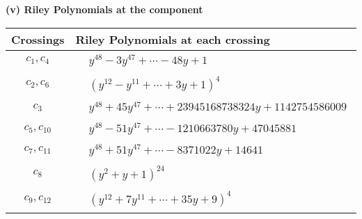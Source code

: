 \documentclass[1p]{elsarticle_modified}
\theoremstyle{definition}
\begin{document}
\flushleft \textbf{(v) Riley Polynomials at the component}\newline \\
\begin{tabular}{m{50pt}|m{274pt}}
Crossings & \hspace{64pt}Riley Polynomials at each crossing \\
\hline $$\begin{aligned}c_{1},c_{4}\end{aligned}$$&$\begin{aligned}
&y^{48}-3 y^{47}+\cdots-48 y+1
\end{aligned}$\\
\hline $$\begin{aligned}c_{2},c_{6}\end{aligned}$$&$\begin{aligned}
&(y^{12}- y^{11}+\cdots+3 y+1)^{4}
\end{aligned}$\\
\hline $$\begin{aligned}c_{3}\end{aligned}$$&$\begin{aligned}
&y^{48}+45 y^{47}+\cdots+23945168738324 y+1142754586009
\end{aligned}$\\
\hline $$\begin{aligned}c_{5},c_{10}\end{aligned}$$&$\begin{aligned}
&y^{48}-51 y^{47}+\cdots-1210663780 y+47045881
\end{aligned}$\\
\hline $$\begin{aligned}c_{7},c_{11}\end{aligned}$$&$\begin{aligned}
&y^{48}+51 y^{47}+\cdots-8371022 y+14641
\end{aligned}$\\
\hline $$\begin{aligned}c_{8}\end{aligned}$$&$\begin{aligned}
&(y^2+y+1)^{24}
\end{aligned}$\\
\hline $$\begin{aligned}c_{9},c_{12}\end{aligned}$$&$\begin{aligned}
&(y^{12}+7 y^{11}+\cdots+35 y+9)^{4}
\end{aligned}$\\
\hline
\end{tabular}\\~\\
\end{document}
